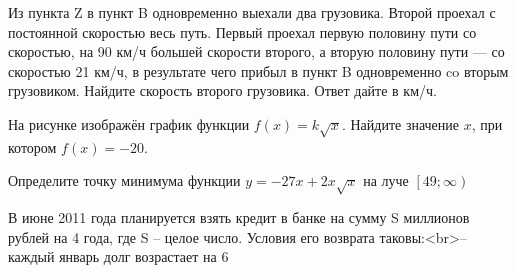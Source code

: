 \begin{taskBN}{9}
Из пункта Z в пункт B одновременно выехали два грузовика. Второй проехал с постоянной скоростью весь путь. Первый проехал первую половину пути со скоростью, на 90 км/ч большей скорости второго, а вторую половину пути — со скоростью 21 км/ч, в результате чего прибыл в пункт B одновременно co вторым грузовиком. Найдите скорость второго грузовика. Ответ дайте в км/ч.
\end{taskBN}

\begin{taskBN}{10}
На рисунке изображён график функции $f(x)=k\sqrt{x}$. Найдите значение $x$, при котором $f(x)=-20$. 
\end{taskBN}

\begin{taskBN}{11}
Определите точку минимума функции $y = -27x+2x \sqrt{x}$ на луче $\left[49;\infty \right)$
\end{taskBN}

\begin{taskBN}{12}
В июне 2011 года планируется взять кредит в банке на сумму S миллионов рублей на 4 года, где S – целое число. Условия его возврата таковы:<br>– каждый январь долг возрастает на 6%
\end{taskBN}

%
%


